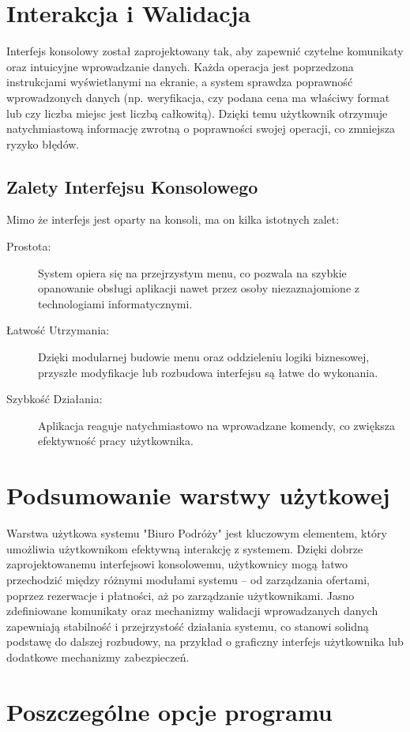 \section{Interakcja i Walidacja}
Interfejs konsolowy został zaprojektowany tak, aby zapewnić czytelne komunikaty oraz intuicyjne wprowadzanie danych. Każda operacja jest poprzedzona instrukcjami wyświetlanymi na ekranie, a system sprawdza poprawność wprowadzonych danych (np. weryfikacja, czy podana cena ma właściwy format lub czy liczba miejsc jest liczbą całkowitą). Dzięki temu użytkownik otrzymuje natychmiastową informację zwrotną o poprawności swojej operacji, co zmniejsza ryzyko błędów.


\subsection{Zalety Interfejsu Konsolowego}
Mimo że interfejs jest oparty na konsoli, ma on kilka istotnych zalet:
\begin{description}
    \item[Prostota:] System opiera się na przejrzystym menu, co pozwala na szybkie opanowanie obsługi aplikacji nawet przez osoby niezaznajomione z technologiami informatycznymi.
    \item[Łatwość Utrzymania:] Dzięki modularnej budowie menu oraz oddzieleniu logiki biznesowej, przyszłe modyfikacje lub rozbudowa interfejsu są łatwe do wykonania.
    \item[Szybkość Działania:] Aplikacja reaguje natychmiastowo na wprowadzane komendy, co zwiększa efektywność pracy użytkownika.
\end{description}

\section{Podsumowanie warstwy użytkowej}
Warstwa użytkowa systemu "Biuro Podróży" jest kluczowym elementem, który umożliwia użytkownikom efektywną interakcję z systemem. Dzięki dobrze zaprojektowanemu interfejsowi konsolowemu, użytkownicy mogą łatwo przechodzić między różnymi modułami systemu – od zarządzania ofertami, poprzez rezerwacje i płatności, aż po zarządzanie użytkownikami. Jasno zdefiniowane komunikaty oraz mechanizmy walidacji wprowadzanych danych zapewniają stabilność i przejrzystość działania systemu, co stanowi solidną podstawę do dalszej rozbudowy, na przykład o graficzny interfejs użytkownika lub dodatkowe mechanizmy zabezpieczeń.

\section{Poszczególne opcje programu}

